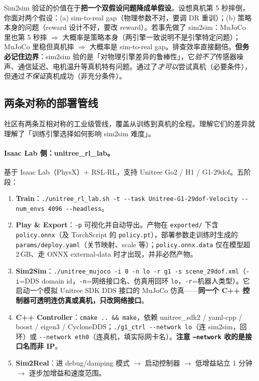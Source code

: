 \begin{insight}\label{ins:rlmc-s2r-sim2sim}
Sim2sim 验证的价值在于\textbf{把一个双假设问题降成单假设}。设想真机第 5 秒摔倒，你面对两个假设：(a) sim-to-real gap（物理参数不对，要调 DR 重训）；(b) 策略本身的问题（reward 设计不好，要改 reward）。若事先做了 sim2sim：MuJoCo 里也第 5 秒摔 $\Rightarrow$ 大概率是策略本身（两引擎一致说明不是引擎特定问题）；MuJoCo 里稳但真机摔 $\Rightarrow$ 大概率是 sim-to-real gap。排查效率直接翻倍。\textbf{但务必记住边界}：sim2sim 验的是「对物理引擎差异的鲁棒性」，它\emph{验不了}传感器噪声、通信延迟、电机温升等真机特有问题。通过了\emph{才可以}尝试真机（必要条件），但通过\emph{不保证}真机成功（非充分条件）。
\end{insight}

\subsection{两条对称的部署管线}
\label{sec:rlmc-s2r-pipelines}

社区有两条互相对称的工业级管线，覆盖从训练到真机的全程。理解它们的差异就理解了「训练引擎选择如何影响 sim2sim 难度」。

\paragraph{Isaac Lab 侧：unitree\_rl\_lab。}基于 Isaac Lab（PhysX）$+$ RSL-RL，支持 Unitree Go2 / H1 / G1-29dof\cite{unitree_rl_lab}。五阶段：

\begin{enumerate}
  \item \textbf{Train}：\verb|./unitree_rl_lab.sh -t --task Unitree-G1-29dof-Velocity --num_envs 4096 --headless|。
  \item \textbf{Play \& Export}：\verb|-p| 可视化并自动导出。产物在 \texttt{exported/} 下含 \texttt{policy.onnx}（及 TorchScript 的 \texttt{policy.pt}），部署参数走训练时生成的 \texttt{params/deploy.yaml}（关节映射、scale 等）；\texttt{policy.onnx.data} 仅在模型超 2\,GB、走 ONNX external-data 时才出现，并非必然产物。
  \item \textbf{Sim2Sim}：\verb|./unitree_mujoco -i 0 -n lo -r g1 -s scene_29dof.xml|（\verb|-i|=DDS domain id，\verb|-n|=网络接口名、仿真用回环 \verb|lo|，\verb|-r|=机器人类型）。它启动一个模拟 Unitree SDK DDS 接口的 MuJoCo 仿真——\textbf{同一个 C++ 控制器可透明连仿真或真机，只改网络接口}。
  \item \textbf{C++ Controller}：\verb|cmake .. && make|，依赖 unitree\_sdk2 / yaml-cpp / boost / eigen3 / CycloneDDS；\verb|./g1_ctrl --network lo|（连 sim2sim，回环）或 \verb|--network eth0|（连真机，填实际网卡名）。\textbf{注意 \texttt{--network} 收的是接口名而非 IP}。
  \item \textbf{Sim2Real}：进 debug/damping 模式 $\to$ 启动控制器 $\to$ 低增益站立 1 分钟 $\to$ 逐步加增益和速度范围。
\end{enumerate}


